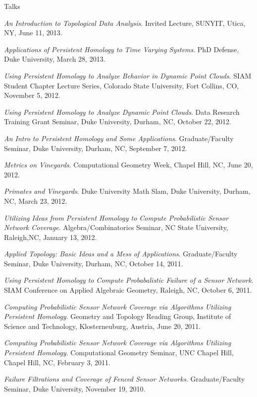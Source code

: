 \documentclass{resume} %
\begin{document}
\begin{rSection}{Talks}
\begin{etaremune}
\item\emph{An Introduction to Topological Data Analysis}. Invited Lecture, SUNYIT, Utica, NY, June 11, 2013. 

\item\emph{Applications of Persistent Homology to Time Varying Systems}. PhD Defense, Duke University, March 28, 2013. 

\item\emph{Using Persistent Homology to Analyze Behavior in Dynamic Point Clouds}. SIAM Student Chapter Lecture Series, Colorado State University, Fort Collins, CO, November 5, 2012. 

\item\emph{Using Persistent Homology to Analyze Dynamic Point Clouds}. Data Research Training Grant Seminar, Duke University, Durham, NC, October 22, 2012. 

\item\emph{An Intro to Persistent Homology and Some Applications}. Graduate/Faculty Seminar, Duke University, Durham, NC, September 7, 2012. 

\item\emph{Metrics on Vineyards}. Computational Geometry Week, Chapel Hill, NC, June 20, 2012. 

\item\emph{Primates and Vineyards}. Duke University Math Slam, Duke University, Durham, NC, March 23, 2012. 

\item\emph{Utilizing Ideas from Persistent Homology to Compute Probabilistic Sensor Network Coverage}. Algebra/Combinatorics Seminar, NC State University, Raleigh,NC, January 13, 2012. 

\item\emph{Applied Topology: Basic Ideas and a Mess of Applications}. Graduate/Faculty Seminar, Duke University, Durham, NC, October 14, 2011. 

\item\emph{Using Persistent Homology to Compute Probabalistic Failure of a Sensor Network}. SIAM Conference on Applied Algebraic Geometry, Raleigh, NC, October 6, 2011. 

\item\emph{Computing Probabilistic Sensor Network Coverage via Algorithms Utilizing Persistent Homology}. Geometry and Topology Reading Group, Institute of Science and Technology, Klosterneuburg, Austria, June 20, 2011. 

\item\emph{Computing Probabilistic Sensor Network Coverage via Algorithms Utilizing Persistent Homology}. Computational Geometry Seminar, UNC Chapel Hill, Chapel Hill, NC, February 3, 2011. 

\item\emph{Failure Filtrations and Coverage of Fenced Sensor Networks}. Graduate/Faculty Seminar, Duke University, November 19, 2010. 

\end{etaremune}
\end{rSection}
\end{document}

